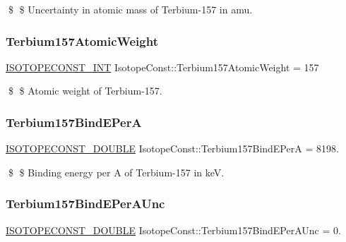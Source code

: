 \$ \$ Uncertainty in atomic mass of Terbium-\/157 in amu. \mbox{\label{group___isotope_const-_terbium-_tb157_ga8c486169a444f071245c0b2d95e10bf5}} 
\subsubsection{\texorpdfstring{Terbium157\+Atomic\+Weight}{Terbium157AtomicWeight}}
{\footnotesize\ttfamily \mbox{\hyperlink{group___isotope_const-_macros_ga5f18360b3e99483a35c32d789e62621c}{I\+S\+O\+T\+O\+P\+E\+C\+O\+N\+S\+T\+\_\+\+I\+NT}} Isotope\+Const\+::\+Terbium157\+Atomic\+Weight = 157}

\$ \$ Atomic weight of Terbium-\/157. \mbox{\label{group___isotope_const-_terbium-_tb157_ga11302817feb8cf889deb85296225d550}} 
\subsubsection{\texorpdfstring{Terbium157\+Bind\+E\+PerA}{Terbium157BindEPerA}}
{\footnotesize\ttfamily \mbox{\hyperlink{group___isotope_const-_macros_ga8f45a7272ce02c0b4c65c44636ed719a}{I\+S\+O\+T\+O\+P\+E\+C\+O\+N\+S\+T\+\_\+\+D\+O\+U\+B\+LE}} Isotope\+Const\+::\+Terbium157\+Bind\+E\+PerA = 8198.}

\$ \$ Binding energy per A of Terbium-\/157 in keV. \mbox{\label{group___isotope_const-_terbium-_tb157_ga9bfacf45dc41263139e82102bac30fde}} 
\subsubsection{\texorpdfstring{Terbium157\+Bind\+E\+Per\+A\+Unc}{Terbium157BindEPerAUnc}}
{\footnotesize\ttfamily \mbox{\hyperlink{group___isotope_const-_macros_ga8f45a7272ce02c0b4c65c44636ed719a}{I\+S\+O\+T\+O\+P\+E\+C\+O\+N\+S\+T\+\_\+\+D\+O\+U\+B\+LE}} Isotope\+Const\+::\+Terbium157\+Bind\+E\+Per\+A\+Unc = 0.}


